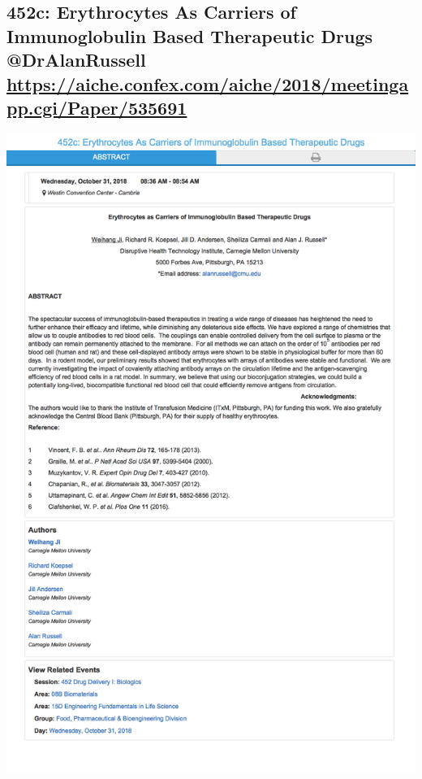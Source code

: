 \documentclass[11pt]{article}
\begin{document}
\subsection{452c: Erythrocytes As Carriers of Immunoglobulin Based Therapeutic Drugs @DrAlanRussell \url{https://aiche.confex.com/aiche/2018/meetingapp.cgi/Paper/535691}}
\label{sec:orgc54ffc5}
\begin{center}
\includegraphics[width=.9\linewidth]{./535691.png}
\end{center}
\end{document}

